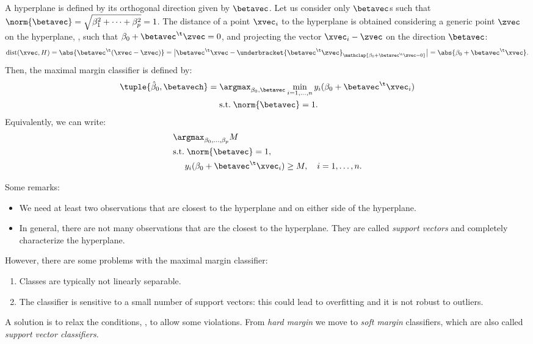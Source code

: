 A hyperplane is defined by its orthogonal direction given by $\betavec$. Let us consider only $\betavec$s such that $\norm{\betavec} = \sqrt{\beta_1^2 + \dots + \beta_p^2} = 1$. The distance of a point $\xvec_i$ to the hyperplane is obtained considering a generic point $\zvec$ on the hyperplane, \ie, such that $\beta_0 + \betavec^\t\zvec = 0$, and projecting the vector $\xvec_i - \zvec$ on the direction $\betavec$:
\begin{equation}
    \operatorname{dist}(\xvec, H) = \abs{\betavec^\t(\xvec - \zvec)} = \bigl|\betavec^\t\xvec - \underbracket{\betavec^\t\zvec}_{\mathclap{\beta_0 + \betavec^\t\zvec = 0}}\bigr| = \abs{\beta_0 + \betavec^\t\xvec}.
\end{equation}
Then, the maximal margin classifier is defined by:
\begin{equation}
    \begin{aligned}
        \tuple{\hat{\beta}_0, \betavech} = & \;\argmax_{\beta_0, \betavec} \min_{i = 1, \ldots, n} y_i(\beta_0 + \betavec^\t\xvec_i) \\
                                           & \;\text{s.t.}\; \norm{\betavec} = 1.
    \end{aligned}
\end{equation}
Equivalently, we can write:
\begin{equation}
    \begin{aligned}
         & \argmax_{\beta_0, \ldots, \beta_p} M                                                \\
         & \text{s.t.}\; \norm{\betavec} = 1,                                 \\
         & \phantom{s.t.} y_i(\beta_0 + \betavec^\t\xvec_i) \geq M, \quad i = 1, \ldots, n.
    \end{aligned}
\end{equation}

Some remarks:
\begin{itemize}
    \item We need at least two observations that are closest to the hyperplane and on either side of the hyperplane.
    \item In general, there are not many observations that are the closest to the hyperplane. They are called \emph{support vectors} and completely characterize the hyperplane.
\end{itemize}

However, there are some problems with the maximal margin classifier:
\begin{enumerate}
    \item Classes are typically not linearly separable.
    \item The classifier is sensitive to a small number of support vectors: this could lead to overfitting and it is not robust to outliers.
\end{enumerate}
A solution is to relax the conditions, \ie, to allow some violations. From \emph {hard margin} we move to \emph{soft margin} classifiers, which are also called \emph{support vector classifiers}.

